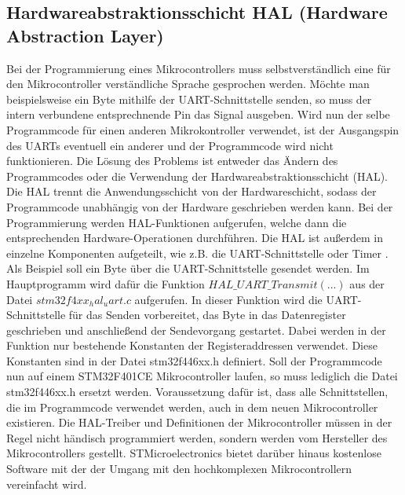 \subsection{Hardwareabstraktionsschicht HAL (Hardware Abstraction Layer)}
Bei der Programmierung eines Mikrocontrollers muss selbstverständlich eine für den Mikrocontroller verständliche Sprache gesprochen werden. Möchte man beispielsweise ein Byte mithilfe der UART-Schnittstelle senden, so muss der intern verbundene entsprechnende Pin das Signal ausgeben. Wird nun der selbe Programmcode für einen anderen Mikrokontroller verwendet, ist der Ausgangspin des UARTs eventuell ein anderer und der Programmcode wird nicht funktionieren. Die Lösung des Problems ist entweder das Ändern des Programmcodes oder die Verwendung der Hardwareabstraktionsschicht (HAL). Die HAL trennt die Anwendungsschicht von der Hardwareschicht, sodass der Programmcode unabhängig von der Hardware geschrieben werden kann. Bei der Programmierung werden HAL-Funktionen aufgerufen, welche dann die entsprechenden Hardware-Operationen durchführen. Die HAL ist außerdem in einzelne Komponenten aufgeteilt, wie z.B. die UART-Schnittstelle oder Timer \cite[s.77 ff.]{IoTSystems}. Als Beispiel soll ein Byte über die UART-Schnittstelle gesendet werden. Im Hauptprogramm wird dafür die Funktion $HAL\_UART\_Transmit(...)$ aus der Datei $stm32f4xx_hal_uart.c$ aufgerufen. In dieser Funktion wird die UART-Schnittstelle für das Senden vorbereitet, das Byte in das Datenregister geschrieben und anschließend der Sendevorgang gestartet. Dabei werden in der Funktion nur bestehende Konstanten der Registeraddressen verwendet. Diese Konstanten sind in der Datei stm32f446xx.h definiert. Soll der Programmcode nun auf einem STM32F401CE Mikrocontroller laufen, so muss lediglich die Datei stm32f446xx.h ersetzt werden. Voraussetzung dafür ist, dass alle Schnittstellen, die im Programmcode verwendet werden, auch in dem neuen Mikrocontroller existieren. Die HAL-Treiber und Definitionen der Mikrocontroller müssen in der Regel nicht händisch programmiert werden, sondern werden vom Hersteller des Mikrocontrollers gestellt. STMicroelectronics bietet darüber hinaus kostenlose Software mit der der Umgang mit den hochkomplexen Mikrocontrollern vereinfacht wird.